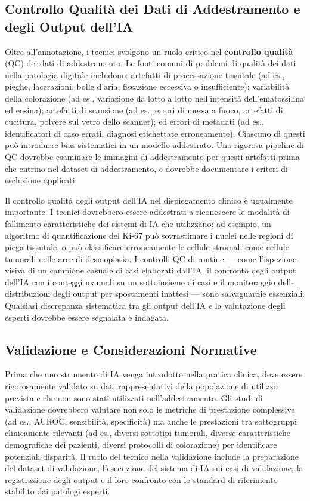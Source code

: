 \subsection{Controllo Qualità dei Dati di Addestramento e degli Output dell'IA}

Oltre all'annotazione, i tecnici svolgono un ruolo critico nel \textbf{controllo qualità} (QC) dei dati di addestramento. Le fonti comuni di problemi di qualità dei dati nella patologia digitale includono: artefatti di processazione tissutale (ad es., pieghe, lacerazioni, bolle d'aria, fissazione eccessiva o insufficiente); variabilità della colorazione (ad es., variazione da lotto a lotto nell'intensità dell'ematossilina ed eosina); artefatti di scansione (ad es., errori di messa a fuoco, artefatti di cucitura, polvere sul vetro dello scanner); ed errori di metadati (ad es., identificatori di caso errati, diagnosi etichettate erroneamente). Ciascuno di questi può introdurre bias sistematici in un modello addestrato. Una rigorosa pipeline di QC dovrebbe esaminare le immagini di addestramento per questi artefatti prima che entrino nel dataset di addestramento, e dovrebbe documentare i criteri di esclusione applicati.

Il controllo qualità degli output dell'IA nel dispiegamento clinico è ugualmente importante. I tecnici dovrebbero essere addestrati a riconoscere le modalità di fallimento caratteristiche dei sistemi di IA che utilizzano: ad esempio, un algoritmo di quantificazione del Ki-67 può sovrastimare i nuclei nelle regioni di piega tissutale, o può classificare erroneamente le cellule stromali come cellule tumorali nelle aree di desmoplasia. I controlli QC di routine — come l'ispezione visiva di un campione casuale di casi elaborati dall'IA, il confronto degli output dell'IA con i conteggi manuali su un sottoinsieme di casi e il monitoraggio delle distribuzioni degli output per spostamenti inattesi — sono salvaguardie essenziali. Qualsiasi discrepanza sistematica tra gli output dell'IA e la valutazione degli esperti dovrebbe essere segnalata e indagata.

\subsection{Validazione e Considerazioni Normative}

Prima che uno strumento di IA venga introdotto nella pratica clinica, deve essere rigorosamente validato su dati rappresentativi della popolazione di utilizzo prevista e che non sono stati utilizzati nell'addestramento. Gli studi di validazione dovrebbero valutare non solo le metriche di prestazione complessive (ad es., AUROC, sensibilità, specificità) ma anche le prestazioni tra sottogruppi clinicamente rilevanti (ad es., diversi sottotipi tumorali, diverse caratteristiche demografiche dei pazienti, diversi protocolli di colorazione) per identificare potenziali disparità. Il ruolo del tecnico nella validazione include la preparazione del dataset di validazione, l'esecuzione del sistema di IA sui casi di validazione, la registrazione degli output e il loro confronto con lo standard di riferimento stabilito dai patologi esperti.

